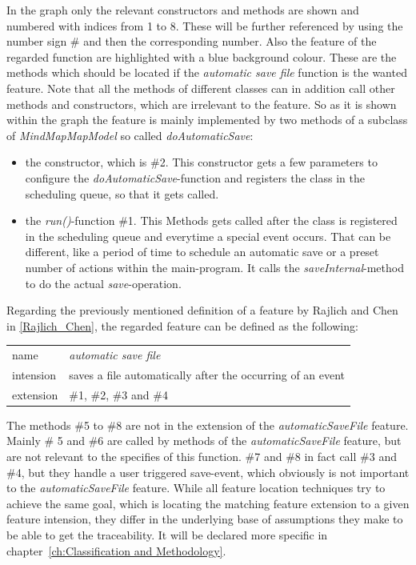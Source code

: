 In the graph only the relevant constructors and methods are shown and numbered with indices from 1 to 8. These will be further referenced by using the number sign \# and then the corresponding number. Also the feature of the regarded function are highlighted with a blue background colour. These are the methods which should be located if the \emph{automatic save file} function is the wanted feature. Note that all the methods of different classes can in addition call other methods and constructors, which are irrelevant to the feature.
So as it is shown within the graph the feature is mainly implemented by two methods of a subclass of \emph{MindMapMapModel} so called \emph{doAutomaticSave}:
\begin{itemize} 
\item the constructor, which is \#2. This constructor gets a few parameters to configure the \emph{doAutomaticSave}-function and registers the class in the scheduling queue, so that it gets called.
\item the \emph{run()}-function \#1. This Methods gets called after the class is registered in the scheduling queue and everytime a special event occurs. That can be different, like a period of time to schedule an automatic save or a preset number of actions within the main-program. It calls the \emph{saveInternal}-method to do the actual \textit{save}-operation.
\end{itemize}

\newpage
Regarding the previously mentioned definition of a feature by Rajlich and Chen in \autoref{Rajlich_Chen}, the regarded feature can be defined as the following: \newline
\begin{tabular}{ l  l }
  name & \emph{automatic save file}  \\
  intension & saves a file automatically after the occurring of an event\\
 extension & \#1,  \#2, \#3 and \#4\\
\end{tabular} \newline
The methods \#5 to \#8 are not in the extension of the \emph{automaticSaveFile} feature.
Mainly \# 5 and \#6 are called by methods of the \emph{automaticSaveFile} feature, but are not relevant to the specifies of this function.
\#7 and \#8 in fact call \#3 and \#4, but they handle a user triggered save-event, which obviously is not important to the \emph{automaticSaveFile} feature.
\newline \newline
While all feature location techniques try to achieve the same goal, which is locating the matching feature extension to a given feature intension, they differ in the underlying base of assumptions they make to be able to get the traceability. It will be declared more specific in chapter~\ref{ch:Classification and Methodology}. 
